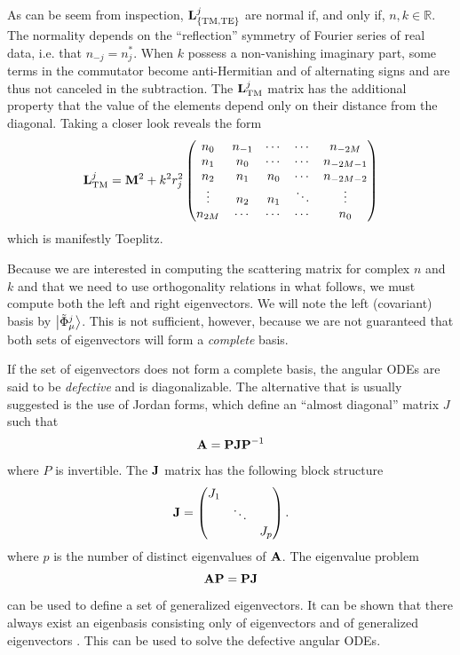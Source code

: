 As can be seem from inspection, $\mathbf{L}^j_\text{\{TM,TE\}}$ are normal 
if, and only if, $n,k\in\mathbb{R}$. The normality depends on the
``reflection'' symmetry of Fourier series of real data, i.e. that 
$n_{-j}=n_j^*$. When $k$ possess a non-vanishing imaginary part, 
some terms in the commutator become anti-Hermitian and of 
alternating signs and are thus not canceled in the subtraction. 
The $\mathbf{L}^j_\text{TM}$ matrix has the additional property that 
the value of the elements depend only on their distance from the diagonal.
Taking a closer look reveals the form
  \begin{equation}
   \mathbf{L}^j_\text{TM} = \mathbf{M}^2 +k^2r_j^2\begin{pmatrix} 
		  n_0 & n_{-1} & \cdots & \cdots & n_{-2M}	\\
		  n_1	  & n_0& \cdots & \cdots & n_{-2M-1}\\
		  n_2	  & n_1	   & n_0& \cdots & n_{-2M-2}\\
		  \vdots  & n_2    & n_1    & \ddots & \vdots   \\
		  n_{2M}  & \cdots & \cdots & \cdots & n_0
		\end{pmatrix}
  \end{equation}
which is manifestly Toeplitz.

Because we are interested in computing the scattering matrix for 
complex $n$ and $k$ and that we 
need to use orthogonality relations in what follows, we must
compute both the left and right eigenvectors. 
We will note the left (covariant) basis by $\Ket{\tilde{\Phi}_\mu^j}$.
This is not sufficient, however, because we are not guaranteed that
both sets of eigenvectors will form a \textit{complete} basis. 

If the set of eigenvectors does not form a complete basis, the
angular ODEs are said to be \textit{defective} and is diagonalizable.
The alternative that is usually suggested is the use of Jordan forms, which
define an ``almost diagonal'' matrix $J$ such that
	\begin{equation}
		\mathbf{A} = \mathbf{PJP}^{-1}
	\end{equation}
where $P$ is invertible. The $\mathbf{J}$ matrix has the following block structure
	\begin{equation}
		\mathbf{J} = \begin{pmatrix} J_1 & & \\ & \ddots & \\ & & J_p\end{pmatrix}.
	\end{equation}
where $p$ is the number of distinct eigenvalues of $\mathbf{A}$. The eigenvalue
problem 
	\begin{equation}
		\mathbf{AP} = \mathbf{PJ}
	\end{equation}
can be used to define a set of generalized eigenvectors. It can be shown 
that there always exist an eigenbasis consisting only of eigenvectors 
and of generalized eigenvectors \cite{MEY2001}. This can be used to 
solve the defective angular ODEs.

